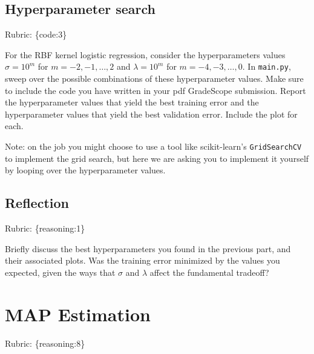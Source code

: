 \documentclass{article}
\def\rubric#1{\gre{Rubric: \{#1\}}}{}
\def\blu#1{{\color{blu}#1}}
\def\gre#1{{\color{gre}#1}}
\begin{document}
\subsection{Hyperparameter search}
\rubric{code:3}

For the RBF kernel logistic regression, consider the hyperparameters values $\sigma=10^m$ for $m=-2,-1,\ldots,2$ and $\lambda=10^m$ for $m=-4,-3,\ldots,0$. \blu{In \texttt{main.py}, sweep over the possible combinations of these hyperparameter values. Make sure to include the code you have written in your pdf GradeScope submission. Report the hyperparameter values that yield the best training error and the hyperparameter values that yield the best validation error. Include the plot for each.}

Note: on the job you might choose to use a tool like scikit-learn's \texttt{GridSearchCV} to implement the grid search, but here we are asking you to implement it yourself by looping over the hyperparameter values.

\subsection{Reflection}
\rubric{reasoning:1}

Briefly discuss the best hyperparameters you found in the previous part, and their associated plots. Was the training error minimized by the values you expected, given the ways that $\sigma$ and $\lambda$ affect the fundamental tradeoff?


\section{MAP Estimation}
\rubric{reasoning:8}
\end{document}
